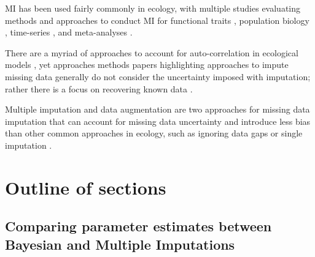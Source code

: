  MI has been used fairly commonly in ecology, with multiple studies evaluating methods and approaches to conduct MI for functional traits \citep{taugourdeau_filling_2014,johnson_handling_2021,penone_imputation_2014}, population biology \citep{onkelinx_working_2017}, time-series \citep{hui_gap-filling_2004}, and meta-analyses \citep{ellington_using_2015}. 


There are a myriad of approaches to account for auto-correlation in ecological models \cite{hefley_basis_2017, borcard_partialling_1992, padilla_space-time_2020}, yet approaches methods papers highlighting approaches to impute missing data generally do not consider the uncertainty imposed with imputation; rather there is a focus on recovering known data \cite{penone_imputation_2014, johnson_handling_2021, ellington_using_2015}.



Multiple imputation and data augmentation are two approaches for missing data imputation that can account for missing data uncertainty and introduce less bias than other common approaches in ecology, such as ignoring data gaps or single imputation \citep{nakagawa_missing_2008, graham_missing_2009}.

\section*{Outline of sections}
\subsection*{Comparing parameter estimates between Bayesian and Multiple Imputations}

